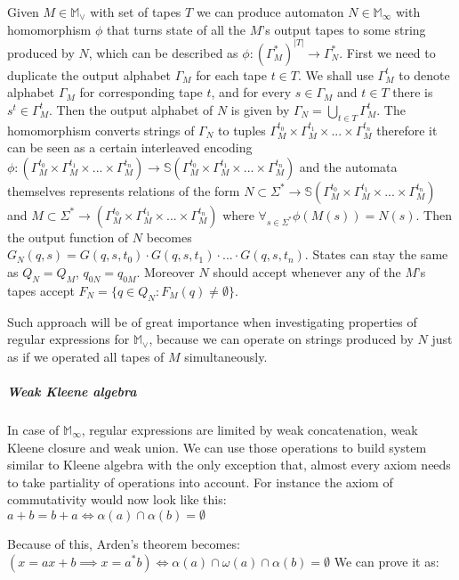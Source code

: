 \documentclass[12pt]{article}
\begin{document}
Given $M \in \mathbb{ M}_\vee$ with set of tapes $T$ we can produce automaton $N \in \mathbb{ M}_\infty$ with homomorphism $\phi$ that turns state of all the $M$'s output tapes to some string produced by $N$, which can be described as  $\phi : (\Gamma_M^*)^{\vert T \vert} \rightarrow \Gamma_N^*$. First we need to duplicate the output alphabet $\Gamma_M$ for each tape $t\in T$. We shall use $\Gamma^t_M$ to denote alphabet $\Gamma_M$ for corresponding tape $t$, and for every $s \in \Gamma_M$ and $t\in T$ there is $s^t \in \Gamma^t_M$. Then the output alphabet of $N$ is given by $\Gamma_N = \bigcup_{t\in T}\Gamma_M^t$. The homomorphism converts strings of $\Gamma_N$ to tuples $\Gamma_M^{t_0} \times \Gamma_M^{t_1} \times ... \times  \Gamma_M^{t_n} $ therefore it can be seen as a certain interleaved encoding $\phi : (\Gamma_M^{t_0} \times \Gamma_M^{t_1} \times ... \times  \Gamma_M^{t_n}) \rightarrow \mathbb{ S}(\Gamma_M^{t_0} \times \Gamma_M^{t_1} \times ... \times  \Gamma_M^{t_n})$ and the automata themselves represents relations of the form $N \subset  \Sigma^* \rightarrow \mathbb{S}(\Gamma_M^{t_0} \times \Gamma_M^{t_1} \times ... \times  \Gamma_M^{t_n})$ and $M \subset \Sigma^* \rightarrow (\Gamma_M^{t_0} \times \Gamma_M^{t_1} \times ... \times  \Gamma_M^{t_n})$ where $\forall_{s\in\Sigma^*} \phi(M(s))=N(s)$. Then the output function of $N$ becomes $G_N(q,s) = G(q,s,t_0) \cdot G(q,s,t_1) \cdot ... \cdot G(q,s,t_n)$. States can stay the same as $Q_N = Q_M$, $q_{0N} = q_{0M}$. Moreover $N$ should accept whenever any of the $M$'s tapes accept $F_N = \{ q \in Q_ N: F_M(q) \ne \emptyset \}$.  

Such approach will be of great importance when investigating properties of regular expressions for $\mathbb{ M}_\vee$, because we can operate on strings produced by $N$ just as if we operated all tapes of $M$ simultaneously.

\subparagraph{ Weak Kleene algebra}  In case of $\mathbb{ M}_\infty$, regular expressions are limited by weak concatenation, weak Kleene closure and weak union. We can use those operations to build system similar to Kleene algebra with the only exception that, almost every axiom needs to take partiality of operations into account. For instance the axiom of commutativity would now look like this: \\
$a + b = b + a \iff \alpha(a) \cap \alpha(b) = \emptyset$

Because of this, Arden's theorem becomes: \\
$(x=ax+b \implies x = a^*b) \iff \alpha(a) \cap \omega(a) \cap \alpha(b) = \emptyset$
We can prove it as: 
\end{document}

